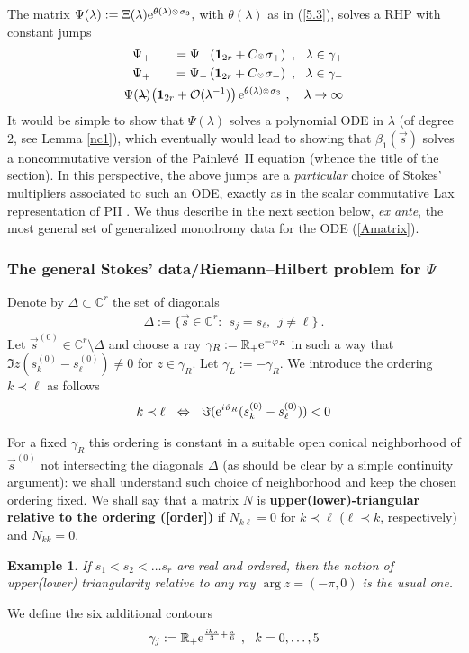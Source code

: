\documentclass{article}
\newtheorem{example}{Example}[section]
\def\ot{\hbox{\resizebox{6pt}{!}{$ \otimes \,
$}}}
\def \C{{\mathbf C}}
\def\s{\sigma}
\def\C{{\mathbb C}}
\def\&{&\hspace{-20pt}}
\def\R{{\mathbb R}}
\def\1{\mathbf 1}
\newcommand{\be}{\begin{eqnarray}}
\newcommand{\ee}{\end{eqnarray}}
\def\le{\left}
\def\ri{\right}
\begin{document}
The matrix $\Psi(\lambda):= \Xi(\lambda) {\rm e}^{\theta(\lambda) \ot  \s_3},$ with $\theta(\lambda)$ as in (\ref{5.3}), solves a RHP with constant
jumps
\be
\Psi_+ &\&= \Psi_- \le(\1_{2r} + C \ot  \s_+\ri) \ ,\ \ \lambda\in \gamma_+
\nonumber \\
\Psi_+ &\& = \Psi_- \le(\1_{2r} + C \ot  \s_-\ri) \ ,\ \ \lambda\in \gamma_-
\nonumber \\
\Psi(\lambda) &\&= \le(\1_{2r} + \mathcal O(\lambda^{-1}) \ri) {\rm e}^{\theta(\lambda)\ot \s_3}\ ,\ \ \ \lambda \to\infty
\label{PsiRHP}
\ee
It would be simple to show that $\Psi(\lambda)$ solves a polynomial ODE in $\lambda$ (of degree $2$, see Lemma \ref{nc1}), which eventually would lead to showing that $\beta_1(\vec s)$ solves a noncommutative version of the Painlev\'e\ II equation (whence the title of the section). In this perspective, the above jumps are a {\em particular} choice of  Stokes' multipliers associated to such an ODE, exactly as in the scalar commutative Lax representation of PII \cite{Its:2003p5}.  We thus describe in the next section below, {\em ex ante}, the most general set of generalized monodromy data  for the ODE (\ref{Amatrix}).






 \subsubsection{The general Stokes'  data/Riemann--Hilbert problem for \texorpdfstring{$\Psi$}{wer}}
 Denote by $\Delta\subset \C^r$ the set of diagonals
 \be
 \Delta:=\{\vec s\in \C^r:\ \ s_j=s_\ell,\ \ j\neq \ell\}\ .
 \ee
 Let $\vec s^{(0)} \in \C^r\setminus \Delta$ and choose a ray $\gamma_R:=\R_+{\rm e}^{-\varphi_R}$ in such a  way that $\Im z(s_k^{(0)}-s_\ell^{(0)}) \neq 0$ for $z\in \gamma_R$. Let $\gamma_L:= -\gamma_R$.
 We  introduce the ordering $k\prec \ell$ as follows 
 \be
k \prec \ell \ \  \Leftrightarrow\ \ \Im ({\rm e}^{i\vartheta_R} (s_k^{(0)}-s_\ell^{(0)}))    < 0 
\label{order}
\ee

For a fixed $\gamma_R$ this ordering is constant in a suitable open conical neighborhood of $\vec s^{(0)}$ not intersecting the diagonals $\Delta$ (as should be clear by a simple continuity argument): we shall understand such choice of neighborhood and keep the chosen ordering fixed.
We shall say that a matrix $N$ is {\bf upper(lower)-triangular relative to the ordering (\ref{order})} if $N_{k\ell}=0$ for $k\prec \ell$ ($\ell\prec k$, respectively) and $N_{kk}=0$.
\begin{example}
If $s_1<s_2<\dots s_r$ are real and ordered, then the notion of upper(lower) triangularity  relative to any ray $\arg z =(-\pi,0) $ is the usual one.
\end{example}
We define  the six additional contours
\be
\gamma_j:= \R_+{\rm e}^{\frac {ik\pi}3+ \frac \pi 6}\ ,\ \ k=0,\dots, 5
\ee 
 
\end{document}
